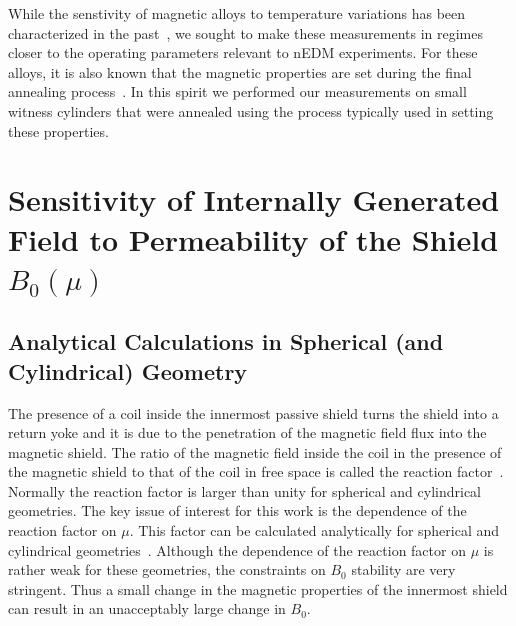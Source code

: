 \documentclass[review]{elsarticle}
\begin{document}
While the senstivity of magnetic alloys to temperature variations has
been characterized in the past~\cite{bib:couderchon,bib:kruppvdm}, we
sought to make these measurements in regimes closer to the operating
parameters relevant to nEDM experiments.  For these alloys, it is also
known that the magnetic properties are set during the final annealing
process~\cite{bib:gupta,bib:bozorth,bib:kruppvdm}.  In this spirit we
performed our measurements on small witness cylinders that were
annealed using the process typically used in setting these properties.


\section{Sensitivity of Internally Generated Field to Permeability of the Shield $B_0(\mu)$}

\subsection{Analytical Calculations in Spherical (and Cylindrical) Geometry}



The presence of a coil inside the innermost passive shield turns the
shield into a return yoke and it is due to the penetration of the
magnetic field flux into the magnetic shield.  The ratio of the
magnetic field inside the coil in the presence of the magnetic shield
to that of the coil in free space is called the reaction
factor~\cite{bib:read_our_other_paper_for_some_references_that_say_this}.
Normally the reaction factor is larger than unity for spherical and
cylindrical geometries.  The key issue of interest for this work is
the dependence of the reaction factor on $\mu$.  This factor can be
calculated analytically for spherical and cylindrical
geometries~\cite{bib:bidinosti,bib:some_paper_from_1899}.  Although
the dependence of the reaction factor on $\mu$ is rather weak for
these geometries, the constraints on $B_0$ stability are very
stringent.  Thus a small change in the magnetic properties of the
innermost shield can result in an unacceptably large change in $B_0$.
\end{document}

